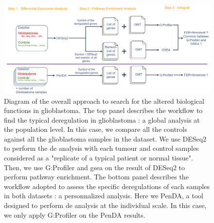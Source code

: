 \begin{figure}
    \centering
    \includegraphics[width=\textwidth]{img/workflow-diagram}
    \caption{
        Diagram of the overall approach to search for the altered biological functions in glioblastoma.
        The top panel describes the workflow to find the typical deregulation in glioblastoma : a global analysis at the population level.
        In this case, we compare all the controls against all the glioblastoma samples in the dataset.
        We use DESeq2 to perform the \acrlong{de} analysis with each tumour and control samples considered as a "replicate of a typical patient or normal tissue".
        Then, we use G:Profiler and \acrshort{gsea} on the result of DESeq2 to perform pathway enrichment.
        The bottom panel describes the workflow adopted to assess the specific deregulations of each samples in both datasets : a personnalized analysis.
        Here we PenDA, a tool designed to perform \acrshort{de} analysis at the individual scale.
        In this case, we only apply G:Profiler on the PenDA results.
    }
    \label{fig:workflow-diagram-global}
\end{figure}

